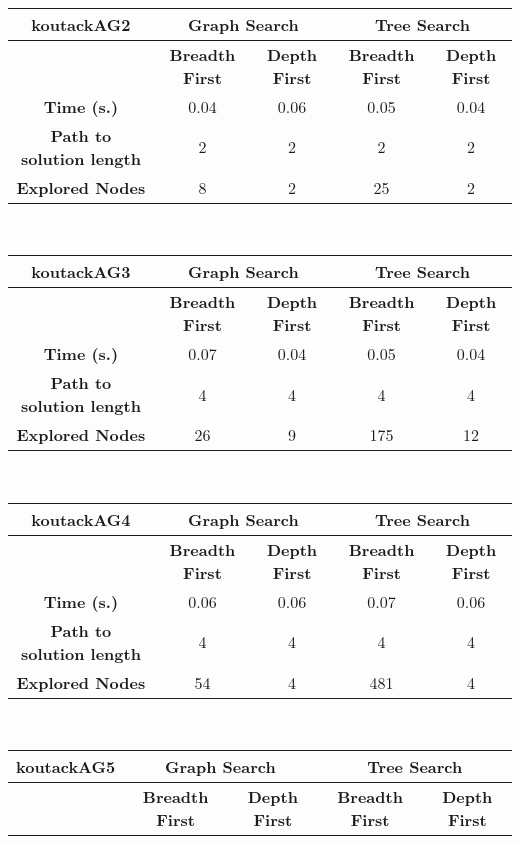 \begin{description}
\begin{tabular}{|c|c|c|c|c|}
\hline 
\end{tabular}\\
\begin{tabular}{|c|c|c|c|c|} 
\hline \textbf{koutackAG2} & \multicolumn{2}{|c|}{\textbf{Graph Search}} & \multicolumn{2}{|c|}{\textbf{Tree Search}} \\ \hline & \textbf{Breadth First} &  \textbf{Depth First} & \textbf{Breadth First} &  \textbf{Depth First}\\ 
\hline \textbf{Time (s.)} & 0.04 & 0.06 & 0.05 & 0.04\\ \textbf{Path to solution length} & 2 & 2 & 2 & 2 \\ \textbf{Explored Nodes} & 8 & 2 & 25 & 2\\ 
\hline 
\end{tabular}\\
\begin{tabular}{|c|c|c|c|c|} 
\hline \textbf{koutackAG3} & \multicolumn{2}{|c|}{\textbf{Graph Search}} & \multicolumn{2}{|c|}{\textbf{Tree Search}} \\ \hline & \textbf{Breadth First} &  \textbf{Depth First} & \textbf{Breadth First} &  \textbf{Depth First}\\ 
\hline \textbf{Time (s.)} & 0.07 & 0.04 & 0.05 & 0.04\\ \textbf{Path to solution length} & 4 & 4 & 4 & 4 \\ \textbf{Explored Nodes} & 26 & 9 & 175 & 12\\ 
\hline 
\end{tabular}\\
\begin{tabular}{|c|c|c|c|c|} 
\hline \textbf{koutackAG4} & \multicolumn{2}{|c|}{\textbf{Graph Search}} & \multicolumn{2}{|c|}{\textbf{Tree Search}} \\ \hline & \textbf{Breadth First} &  \textbf{Depth First} & \textbf{Breadth First} &  \textbf{Depth First}\\ 
\hline \textbf{Time (s.)} & 0.06 & 0.06 & 0.07 & 0.06\\ \textbf{Path to solution length} & 4 & 4 & 4 & 4 \\ \textbf{Explored Nodes} & 54 & 4 & 481 & 4\\ 
\hline 
\end{tabular}\\
\begin{tabular}{|c|c|c|c|c|} 
\hline \textbf{koutackAG5} & \multicolumn{2}{|c|}{\textbf{Graph Search}} & \multicolumn{2}{|c|}{\textbf{Tree Search}} \\ \hline & \textbf{Breadth First} &  \textbf{Depth First} & \textbf{Breadth First} &  \textbf{Depth First}\\ 

\end{tabular}
\end{description}
